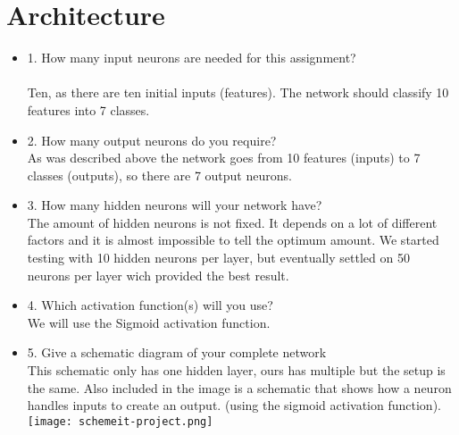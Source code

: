 
\section{Architecture} \label {chapter:architecture}
\begin{itemize}
\item 1. How many input neurons are needed for this assignment?\\\\
Ten, as there are ten initial inputs (features). The network should classify 10 features into 7 classes.
\item 2. How many output neurons do you require?\\
As was described above the network goes from 10 features (inputs) to 7 classes (outputs), so there are 7 output neurons.
\item 3. How many hidden neurons will your network have?\\
The amount of hidden neurons is not fixed. It depends on a lot of different factors and it is almost impossible to tell the optimum amount. We started testing with 10 hidden neurons per layer, but eventually settled on 50 neurons per layer wich provided the best result.
\item 4. Which activation function(s) will you use?\\
We will use the Sigmoid activation function.
\item 5. Give a schematic diagram of your complete network\\
This schematic only has one hidden layer, ours has multiple but the setup is the same. Also included in the image is a schematic that shows how a neuron handles inputs to create an output.
(using the sigmoid activation function).
\texttt{[image: schemeit-project.png]}
\end{itemize}



